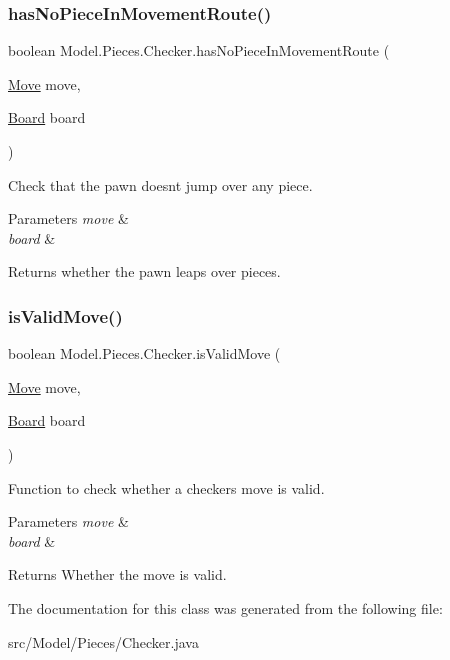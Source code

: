\subsubsection{\texorpdfstring{has\+No\+Piece\+In\+Movement\+Route()}{hasNoPieceInMovementRoute()}}
{\footnotesize\ttfamily boolean Model.\+Pieces.\+Checker.\+has\+No\+Piece\+In\+Movement\+Route (\begin{DoxyParamCaption}\item[{\hyperlink{class_model_1_1_move}{Move}}]{move,  }\item[{\hyperlink{class_model_1_1_board}{Board}}]{board }\end{DoxyParamCaption})}

Check that the pawn doesn\textquotesingle{}t jump over any piece. 
\begin{DoxyParams}{Parameters}
{\em move} & \\
\hline
{\em board} & \\
\hline
\end{DoxyParams}
\begin{DoxyReturn}{Returns}
whether the pawn leaps over pieces. 
\end{DoxyReturn}
\hypertarget{class_model_1_1_pieces_1_1_checker_a833ad4dc58dc068f194b30c5eb989d52}{}\label{class_model_1_1_pieces_1_1_checker_a833ad4dc58dc068f194b30c5eb989d52} 
\subsubsection{\texorpdfstring{is\+Valid\+Move()}{isValidMove()}}
{\footnotesize\ttfamily boolean Model.\+Pieces.\+Checker.\+is\+Valid\+Move (\begin{DoxyParamCaption}\item[{\hyperlink{class_model_1_1_move}{Move}}]{move,  }\item[{\hyperlink{class_model_1_1_board}{Board}}]{board }\end{DoxyParamCaption})}

Function to check whether a checker\textquotesingle{}s move is valid. 
\begin{DoxyParams}{Parameters}
{\em move} & \\
\hline
{\em board} & \\
\hline
\end{DoxyParams}
\begin{DoxyReturn}{Returns}
Whether the move is valid. 
\end{DoxyReturn}


The documentation for this class was generated from the following file\+:\begin{DoxyCompactItemize}
\item 
src/\+Model/\+Pieces/Checker.\+java\end{DoxyCompactItemize}
